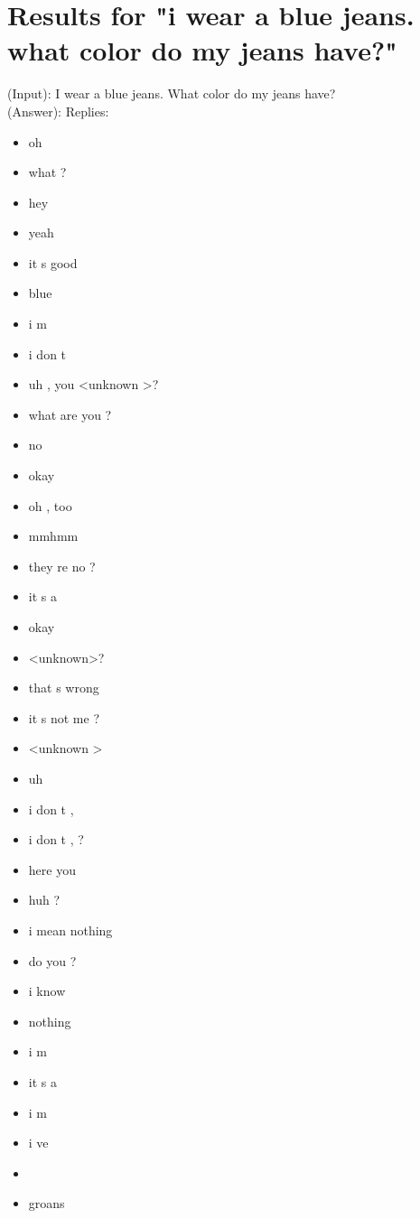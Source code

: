 \section{Results for "i wear a blue jeans. what color do my jeans have?"}
\label{apendix:result2:Beam-search-200:OpenSubtitle}
(Input): I wear a blue jeans. What color do my jeans have?\\
(Answer): Replies:
\begin{multicols}{4}
	\begin{itemize}[noitemsep]
		\item oh
		\item what ?
		\item hey
		\item yeah
		\item it s good
		\item blue
		\item i m
		\item i don t
		\item uh , you \textless unknown \textgreater ?
		\item what are you ?
		\item no
		\item okay
		\item oh , too
		\item mmhmm
		\item they re no ?
		\item it s a
		\item okay
		\item \textless unknown\textgreater ?
		\item that s wrong
		\item it s not me ?
		\item \textless unknown \textgreater
		\item uh
		\item i don t ,
		\item i don t , ?
		\item here you
		\item huh ?
		\item i mean nothing
		\item do you ?
		\item i know
		\item nothing
		\item i m
		\item it s a
		\item i m
		\item i ve
		\item
		\item groans

\end{itemize}
\end{multicols}
